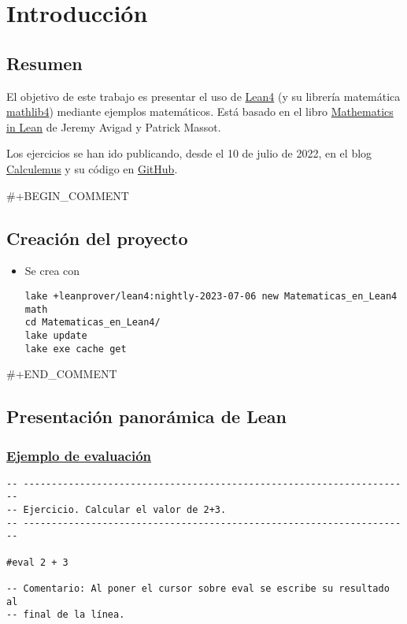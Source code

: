 

\chapter{Introducción}
\label{sec:org1697995}

\section{Resumen}
\label{sec:orgd6eb0b0}

El objetivo de este trabajo es presentar el uso de \href{https://leanprover.github.io/lean4/doc/}{Lean4} (y su librería
matemática \href{https://github.com/leanprover-community/mathlib4}{mathlib4}) mediante ejemplos matemáticos. Está basado en el
libro \href{https://leanprover-community.github.io/mathematics\_in\_lean/mathematics\_in\_lean.pdf}{Mathematics in Lean} de Jeremy Avigad y Patrick Massot.

Los ejercicios se han ido publicando, desde el 10 de julio de 2022, en
el blog \href{https://www.glc.us.es/\~jalonso/calculemus}{Calculemus} y su código en \href{https://github.com/jaalonso/Calculemus2}{GitHub}.

\#+BEGIN\_COMMENT
\section{Creación del proyecto}
\label{sec:org0b24e61}

\begin{itemize}
\item Se crea con
\begin{verbatim}
lake +leanprover/lean4:nightly-2023-07-06 new Matematicas_en_Lean4 math
cd Matematicas_en_Lean4/
lake update
lake exe cache get
\end{verbatim}
\end{itemize}
\#+END\_COMMENT

\section{Presentación panorámica de Lean}
\label{sec:orgbf445e0}

\subsection{\href{./src/Introduccion/Ejemplo\_de\_evaluacion.lean}{Ejemplo de evaluación}}
\label{sec:orgcb5da9e}
\begin{verbatim}
-- ---------------------------------------------------------------------
-- Ejercicio. Calcular el valor de 2+3.
-- ---------------------------------------------------------------------

#eval 2 + 3

-- Comentario: Al poner el cursor sobre eval se escribe su resultado al
-- final de la línea.
\end{verbatim}

